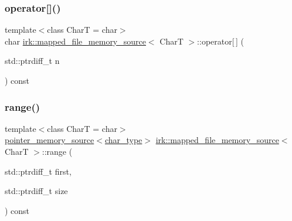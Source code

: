 \subsubsection{\texorpdfstring{operator[]()}{operator[]()}}
{\footnotesize\ttfamily template$<$class CharT  = char$>$ \\
char \mbox{\hyperlink{classirk_1_1mapped__file__memory__source}{irk\+::mapped\+\_\+file\+\_\+memory\+\_\+source}}$<$ CharT $>$\+::operator\mbox{[}$\,$\mbox{]} (\begin{DoxyParamCaption}\item[{std\+::ptrdiff\+\_\+t}]{n }\end{DoxyParamCaption}) const\hspace{0.3cm}{\ttfamily [inline]}}

\mbox{\label{classirk_1_1mapped__file__memory__source_a9c7d09e97727c63b3b889ab03b13012e}} 
\subsubsection{\texorpdfstring{range()}{range()}}
{\footnotesize\ttfamily template$<$class CharT  = char$>$ \\
\mbox{\hyperlink{classirk_1_1pointer__memory__source}{pointer\+\_\+memory\+\_\+source}}$<$\mbox{\hyperlink{classirk_1_1mapped__file__memory__source_a9b4319787fae825c6a27be1e58447386}{char\+\_\+type}}$>$ \mbox{\hyperlink{classirk_1_1mapped__file__memory__source}{irk\+::mapped\+\_\+file\+\_\+memory\+\_\+source}}$<$ CharT $>$\+::range (\begin{DoxyParamCaption}\item[{std\+::ptrdiff\+\_\+t}]{first,  }\item[{std\+::ptrdiff\+\_\+t}]{size }\end{DoxyParamCaption}) const\hspace{0.3cm}{\ttfamily [inline]}}

\mbox{\label{classirk_1_1mapped__file__memory__source_aa465b35d4c1ec9bc77337fec2cfd062d}} 
